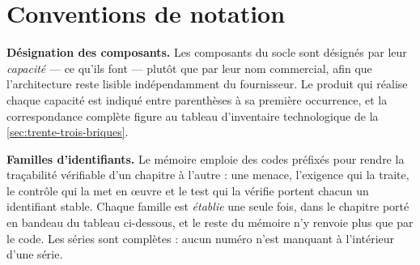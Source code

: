 \chapter*{Conventions de notation}
\thispagestyle{plain}

\noindent\textbf{Désignation des composants.} Les composants du socle sont désignés par leur
\emph{capacité} --- ce qu'ils font --- plutôt que par leur nom commercial, afin que
l'architecture reste lisible indépendamment du fournisseur. Le produit qui réalise chaque
capacité est indiqué entre parenthèses à sa première occurrence, et la correspondance complète
figure au tableau d'inventaire technologique de la \cref{sec:trente-trois-briques}.

\medskip
\noindent\textbf{Familles d'identifiants.} Le mémoire emploie des codes préfixés pour rendre la
traçabilité vérifiable d'un chapitre à l'autre : une menace, l'exigence qui la traite, le contrôle
qui la met en \oe uvre et le test qui la vérifie portent chacun un identifiant stable. Chaque
famille est \emph{établie} une seule fois, dans le chapitre porté en bandeau du tableau ci-dessous,
et le reste du mémoire n'y renvoie plus que par le code. Les séries sont complètes : aucun numéro
n'est manquant à l'intérieur d'une série.

